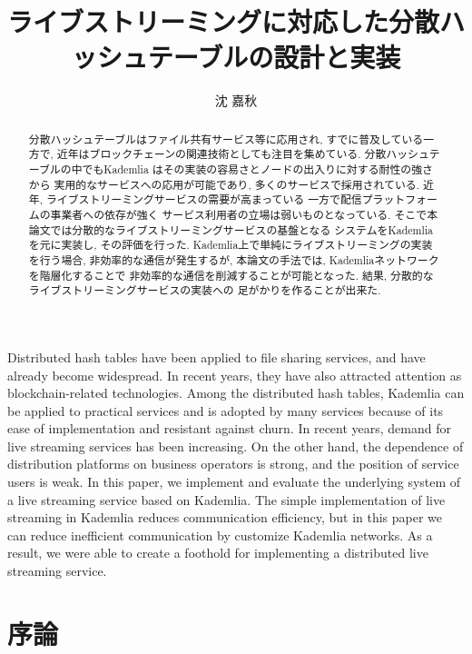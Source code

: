 \documentclass[sotsuron]{jcsie}
\title{ライブストリーミングに対応した分散ハッシュテーブルの設計と実装}
\author{沈 嘉秋}
\begin{document}
\maketitle
\emaketitle
{}
\begin{abstract}    
分散ハッシュテーブルはファイル共有サービス等に応用され, 
すでに普及している一方で, 
近年はブロックチェーンの関連技術としても注目を集めている.
%
分散ハッシュテーブルの中でもKademlia
はその実装の容易さとノードの出入りに対する耐性の強さから
実用的なサービスへの応用が可能であり, 
多くのサービスで採用されている.
%
近年, ライブストリーミングサービスの需要が高まっている
一方で配信プラットフォームの事業者への依存が強く
サービス利用者の立場は弱いものとなっている.
そこで本論文では分散的なライブストリーミングサービスの基盤となる
システムをKademliaを元に実装し, その評価を行った.
%
Kademlia上で単純にライブストリーミングの実装を行う場合, 
非効率的な通信が発生するが, 本論文の手法では, 
Kademliaネットワークを階層化することで
非効率的な通信を削減することが可能となった.
%
結果, 分散的なライブストリーミングサービスの実装への
足がかりを作ることが出来た.
\end{abstract}
\begin{eabstract}
Distributed hash tables have been applied to file sharing services, 
and have already become widespread.
In recent years, they have also attracted attention as 
blockchain-related technologies.
%
Among the distributed hash tables, 
Kademlia can be applied to practical services 
and is adopted by many services 
because of its ease of implementation and resistant against churn.
%
In recent years, demand for live streaming services has been increasing.
On the other hand,
the dependence of distribution platforms on business operators is strong, 
and the position of service users is weak.
%
In this paper, we implement and evaluate the underlying system 
of a live streaming service based on Kademlia.
%
The simple implementation of live streaming in 
Kademlia reduces communication efficiency, 
but in this paper we can reduce inefficient communication by 
customize Kademlia networks.
%
As a result, we were able to create a foothold for implementing 
a distributed live streaming service.
\end{eabstract}
\setcounter{tocdepth}{2}
\tableofcontents
{}


\chapter{序論}
\end{document}
